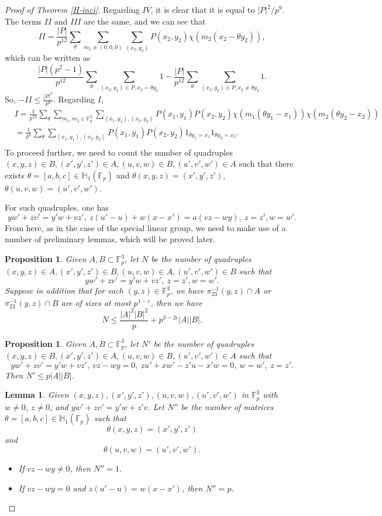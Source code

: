 \documentclass[11pt]{article}
\newtheorem{proposition}[theorem]{Proposition}
\newtheorem{lemma}[theorem]{Lemma}
\def\Fbb{\mathbb{F}}
\begin{document}
\begin{proof}[Proof of Theorem \ref{H-inci}]
Regarding $IV$, it is clear that it is equal to $|P|^2/p^9$. The terms $II$ and $III$ are the same, and we can see that 
\[II=\frac{|P|}{p^{12}}\sum_{\theta}\sum_{m_2\ne (0, 0, 0)}\sum_{(x_2, y_2)}P(x_2, y_2)\chi(m_2(x_2-\theta y_2)),\]
which can be written as 
\[\frac{|P|(p^2-1)}{p^{12}}\sum_{\theta}\sum_{(x_2, y_2)\in P, x_2=\theta y_2} 1-\frac{|P|}{p^{12}}\sum_{\theta}\sum_{(x_2, y_2)\in P, x_2\ne\theta y_2}1.\]
So, $-II\le \frac{|P|^2}{p^9}$.
Regarding $I$,
\begin{align*}
    &I=\frac{1}{p^{12}}\sum_{\theta}\sum_{m_1, m_2\in \mathbb{F}_p^3}\sum_{(x_1, y_1), (x_2, y_2)}P(x_1, y_1)P(x_2, y_2)\chi(m_1(\theta y_1-x_1))\chi(m_2(\theta y_2-x_2))\\
    &=\frac{1}{p^6}\sum_{\theta}\sum_{(x_1, y_1), (x_2, y_2)}P(x_1, y_1)P(x_2, y_2)1_{\theta y_1=x_1}1_{\theta y_2=x_2}.\\
\end{align*}
To proceed further, we need to count the number of quadruples $(x, y, z)\in B, (x', y', z')\in A, (u, v, w)\in B, (u', v', w')\in A$ such that there exists $\theta=[a, b, c]\in \mathbb{H}_1(\Fbb_p)$ and $\theta (x, y, z)=(x', y', z')$, ~$\theta(u, v, w)=(u', v', w')$.

For such quadruples, one has 
\[yw'+zv'=y'w+vz', ~z(u'-u)+w(x-x')=a(vz-wy), ~z=z', w=w'.\]
From here, as in the case of the special linear group, we need to make use of a number of preliminary lemmas, which will be proved later.
\begin{proposition}\label{propo2.1}
Given $A, B\subset \mathbb{F}_p^3$, let $N$ be the number of quadruples $(x, y, z)\in A, (x', y', z')\in B, (u, v, w)\in A, (u', v', w')\in B$ such that 
\[yw'+zv'=y'w+vz', ~z=z', w=w'.\]
Suppose in addition that for each $(y, z)\in \mathbb{F}_p^2$, we have $\pi_{23}^{-1}(y, z)\cap A$ or $\pi_{23}^{-1}(y, z)\cap B$ are of sizes at most $p^{1-\epsilon}$, then we have 
\[N\le \frac{|A|^2|B|^2}{p}+p^{3-2\epsilon}|A||B|.\]
\end{proposition}
\begin{proposition}\label{propo2.2}
    Given $A, B\subset \mathbb{F}_p^3$, let $N'$ be the number of quadruples $(x, y, z)\in B, (x', y', z')\in A, (u, v, w)\in B, (u', v', w')\in A$ such that 
\[yw'+zv'=y'w+vz', ~vz-wy=0, ~zu'+xw'-z'u-x'w=0, ~w=w',~z=z'.\]
Then $N'\le p|A||B|$.
\end{proposition}
\begin{lemma}\label{lm23}
    Given $(x, y, z), (x', y', z'), (u, v, w), (u', v', w')$ in $\mathbb{F}_p^3$ with $w\ne 0$, $z\ne 0$, and $yw'+zv'=y'w+z'v$. Let $N''$ be the number of matrices $\theta=[a, b, c]\in \mathbb{H}_1(\Fbb_p)$ such that 
\[\theta(x, y, z)=(x', y', z')\]
and 
\[\theta(u, v, w)=(u', v', w').\]
\begin{itemize}
    \item If $vz-wy\ne 0$, then $N''=1$. 
    \item If $vz-wy=0$ and $z(u'-u)=w(x-x')$, then $N''=p$.


\end{itemize}
\end{lemma}
\end{proof}
\end{document}
